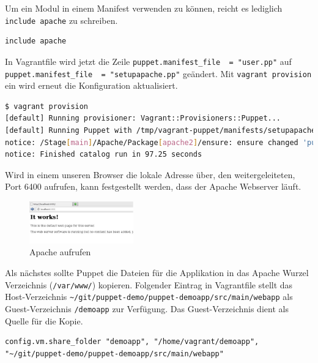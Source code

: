 \documentclass[12pt,a4paper,ngerman]{article}
\begin{document}
Um ein Modul in einem Manifest verwenden zu können, reicht es lediglich \lstinline$include apache$ zu schreiben.
\begin{lstlisting}[language=puppet,caption=Inhalt von manifests/setupapache.pp, label=setupapache.pp]
include apache
\end{lstlisting}

In Vagrantfile wird jetzt die Zeile \lstinline$puppet.manifest_file  = "user.pp"$ auf \lstinline$puppet.manifest_file  = "setupapache.pp"$ geändert. Mit \lstinline$vagrant provision$ ein wird erneut die Konfiguration aktualisiert.

\begin{lstlisting}[language=sh,caption=vagrant provisioning für Apache, label=provisioning_apache]
$ vagrant provision
[default] Running provisioner: Vagrant::Provisioners::Puppet...
[default] Running Puppet with /tmp/vagrant-puppet/manifests/setupapache.pp...
notice: /Stage[main]/Apache/Package[apache2]/ensure: ensure changed 'purged' to 'present'
notice: Finished catalog run in 97.25 seconds
\end{lstlisting}

Wird in einem unseren Browser die lokale Adresse über, den weitergeleiteten, Port 6400 aufrufen, kann festgestellt werden, dass der Apache Webserver läuft.
\begin{figure}
  \begin{center}
    \includegraphics[width=0.4\textwidth]{images/apache.pdf}
  \end{center}
  \caption{Apache aufrufen}
  \label{apache}
\end{figure}

Als nächstes sollte Puppet die Dateien für die Applikation in das Apache Wurzel Verzeichnis (\lstinline$/var/www/$) kopieren. Folgender Eintrag in Vagrantfile stellt das Host-Verzeichnis \lstinline$~/git/puppet-demo/puppet-demoapp/src/main/webapp$ als Guest-Verzeichnis \lstinline$/demoapp$ zur Verfügung. Das Guest-Verzeichnis dient als Quelle für die Kopie.
\begin{lstlisting}[language=vagrant,caption=Shared folders in Vagrantfile konfigurieren, label=vagrantsharedfolder]
config.vm.share_folder "demoapp", "/home/vagrant/demoapp", "~/git/puppet-demo/puppet-demoapp/src/main/webapp"
\end{lstlisting}
\end{document}
